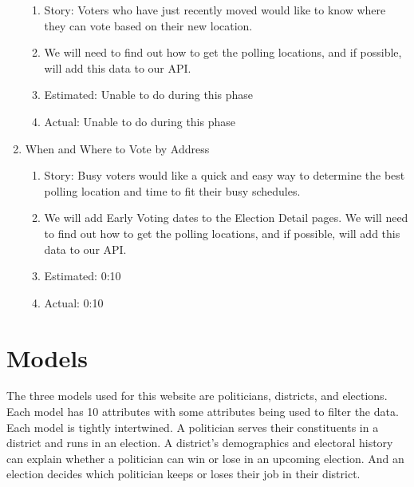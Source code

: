 \documentclass[11t]{article}
\begin{document}
\begin{enumerate}
\begin{enumerate}
        \item Story: Voters who have just recently moved would like to know where they can vote based on their new location.
        \item We will need to find out how to get the polling locations, and if possible, will add this data to our API.
        \item Estimated: Unable to do during this phase
        \item Actual: Unable to do during this phase
    \end{enumerate}
    \item When and Where to Vote by Address
    \begin{enumerate}
        \item Story: Busy voters would like a quick and easy way to determine the best polling location and time to fit their busy schedules.
        \item We will add Early Voting dates to the Election Detail pages. We will need to find out how to get the polling locations, and if possible, will add this data to our API.
        \item Estimated: 0:10
        \item Actual: 0:10
    \end{enumerate}
\end{enumerate}

\section{Models}
The three models used for this website are politicians, districts, and elections. Each model has 10 attributes with some attributes being used to filter the data. Each model is tightly intertwined. A politician serves their constituents in a district and runs in an election. A district’s demographics and electoral history can explain whether a politician can win or lose in an upcoming election. And an election decides which politician keeps or loses their job in their district.
\end{document}
